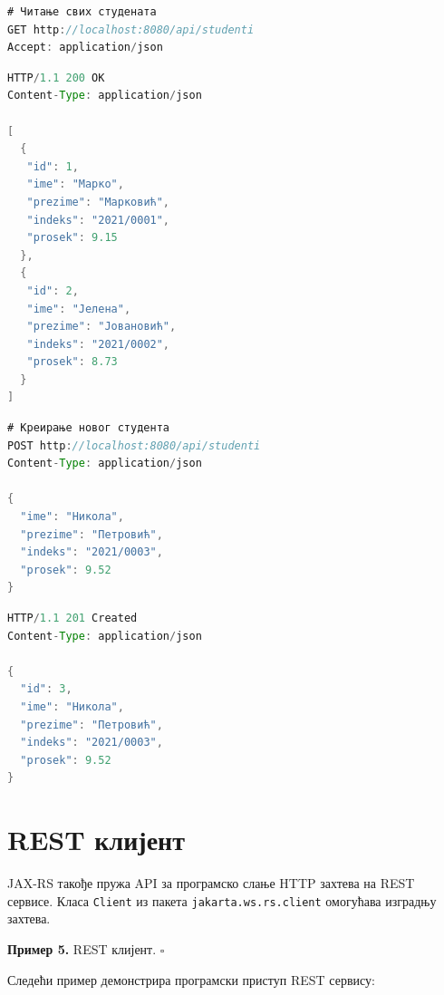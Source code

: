 \begin{lstlisting}[language=Java]
# Читање свих студената
GET http://localhost:8080/api/studenti
Accept: application/json
\end{lstlisting}


\begin{lstlisting}[language=Java]
HTTP/1.1 200 OK
Content-Type: application/json
 
[
  {
   "id": 1,
   "ime": "Марко",
   "prezime": "Марковић",
   "indeks": "2021/0001",
   "prosek": 9.15
  },
  {
   "id": 2,
   "ime": "Јелена",
   "prezime": "Јовановић",
   "indeks": "2021/0002",
   "prosek": 8.73
  }
]
\end{lstlisting}


\begin{lstlisting}[language=Java]
# Креирање новог студента
POST http://localhost:8080/api/studenti
Content-Type: application/json
 
{
  "ime": "Никола",
  "prezime": "Петровић",
  "indeks": "2021/0003",
  "prosek": 9.52
}
\end{lstlisting}


\begin{lstlisting}[language=Java]
HTTP/1.1 201 Created
Content-Type: application/json
 
{
  "id": 3,
  "ime": "Никола",
  "prezime": "Петровић",
  "indeks": "2021/0003",
  "prosek": 9.52
}
\end{lstlisting}


\section{REST клијент}

JAX-RS такође пружа API за програмско слање HTTP захтева на REST сервисе. Класа \texttt{Client} из пакета \texttt{jakarta.ws.rs.client} омогућава изградњу захтева.


\bigskip

\noindent \textbf{Пример 5.} REST клијент. $\square$

\medskip

Следећи пример демонстрира програмски приступ REST сервису:


